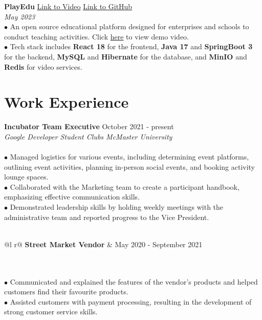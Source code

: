 \documentclass[letterpaper,12pt]{article}
\begin{document}
\textbf{PlayEdu} \hfill \href{https://youtu.be/8IWqM2eHLhc}{Link to Video} \hspace{0.2cm} \href{https://github.com/Zicheng-Li/React-Spring_Boot-PlayEdu}{Link to GitHub} \\
\textit{May 2023} \\
\hspace{0.1cm} $\bullet$ An open source educational platform designed for enterprises and schools to conduct teaching activities. Click \href{https://youtu.be/8IWqM2eHLhc}{here} to view demo video.\\
\hspace{0.1cm} $\bullet$ Tech stack includes \textbf{React 18} for the frontend, \textbf{Java 17} and \textbf{SpringBoot 3} for the backend, \textbf{MySQL} and \textbf{Hibernate} for the database, and \textbf{MinIO} and \textbf{Redis} for video services.


\section{Work Experience}
\textbf{Incubator Team Executive}  \hfill   October 2021 - present \\
\textit{Google Developer Student Clubs McMaster University}
\\\\\hspace{0.1cm} $\bullet$ Managed logistics for various events, including determining event platforms, outlining event activities, planning in-person social events, and booking activity lounge spaces. \\ 
\hspace{0.1cm} $\bullet$ \hspace{0.05cm}Collaborated with the Marketing team to create a participant handbook, emphasizing effective communication skills.\\
\hspace{0.1cm} $\bullet$ \hspace{0.03cm}Demonstrated leadership skills by holding weekly meetings with the administrative team and reported progress to the Vice President.\\\\
\begin{tabularx}{\linewidth}{ @{}l r@{} }
\textbf{Street Market Vendor} &  \hfill \normalsize{May 2020 - September 2021} \\
\end{tabularx} \\\\
\hspace{0.1cm} $\bullet$ Communicated and explained the features of the vendor's products and helped customers find their favourite products.\\
\hspace{0.1cm} $\bullet$ \hspace{0.05cm}Assisted customers with payment processing, resulting in the development of strong customer service skills.
\end{document}
